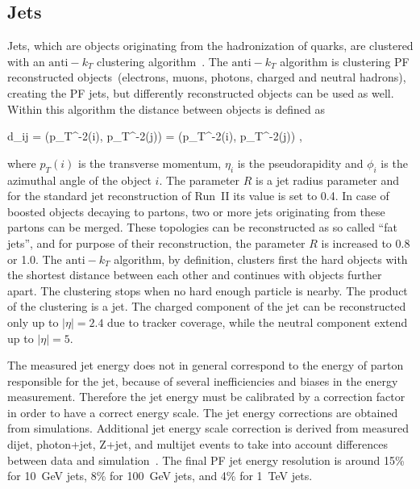 

\subsection{Jets}

Jets, which are objects originating from the hadronization of quarks, are clustered with an $\mathrm{anti-}k_{T}$ clustering algorithm~\cite{Cacciari:2008gp, Cacciari:2011ma}. The $\mathrm{anti-}k_{T}$ algorithm is clustering PF reconstructed objects~(electrons, muons, photons, charged and neutral hadrons), creating the PF jets, but differently reconstructed objects can be used as well. Within this algorithm the distance between objects is defined as

{   
    d_{ij} = ({p_{T}}^{-2}(i), {p_{T}}^{-2}(j))  =  ({p_{T}}^{-2}(i), {p_{T}}^{-2}(j)) ,
}

where $p_{T}(i)$ is the transverse momentum, $\eta_{i}$ is the pseudorapidity and $\phi_{i}$ is the azimuthal angle of the object $i$. The parameter $R$ is a jet radius parameter and for the standard jet reconstruction of Run~II its value is set to 0.4. In case of boosted objects decaying to partons, two or more jets originating from these partons can be merged. These topologies can be reconstructed as so called ``fat jets'', and for purpose of their reconstruction, the parameter $R$ is increased to 0.8 or 1.0. The $\mathrm{anti-}k_{T}$ algorithm, by definition, clusters first the hard objects with the shortest distance between each other and continues with objects further apart. The clustering stops when no hard enough particle is nearby. The product of the clustering is a jet. The charged component of the jet can be reconstructed only up to $|\eta|=2.4$ due to tracker coverage, while the neutral component extend up to  $|\eta|=5$.

The measured jet energy does not in general correspond to the energy of parton responsible for the jet, because of several inefficiencies and biases in the energy measurement. Therefore the jet energy must be calibrated by a correction factor in order to have a correct energy scale. The jet energy corrections are obtained from simulations. Additional jet energy scale correction is derived from measured dijet, photon+jet, Z+jet, and multijet events to take into account differences between data and simulation~\cite{Khachatryan:2016kdb}. The final PF jet energy resolution is around 15\% for 10~GeV jets, 8\% for 100~GeV jets, and 4\% for 1~TeV jets. %


